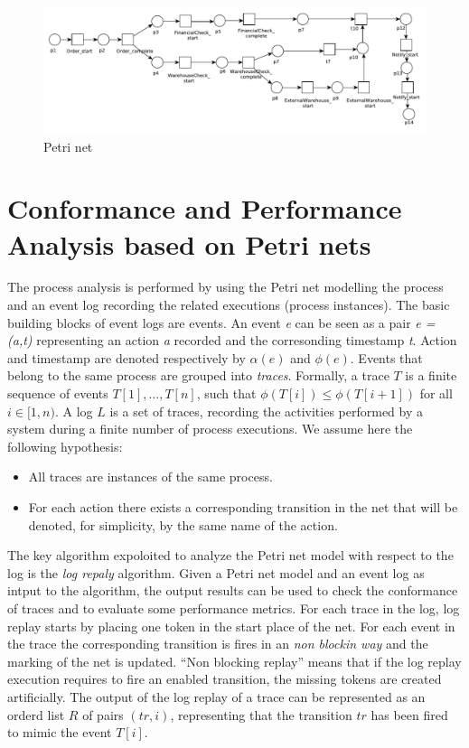 \documentclass[11pt]{article}
\begin{document}
\begin{figure}[h]\label{pnet}
\includegraphics[width=360pt]
{./items/Sales_PN.pdf}
\caption{Petri net}
\end{figure}


\section{Conformance and Performance Analysis based on Petri nets}\label{Background}

The process analysis is performed by using the Petri net modelling the process and an event log recording the related executions (process instances). The basic building blocks of event logs are events. An event {\itshape e} can be seen as a pair {\itshape e = (a,t) } representing an action {\itshape a } recorded and the corresonding timestamp {\itshape t}. Action and timestamp are denoted respectively by $\alpha(e)$ and $\phi(e)$. Events that belong to the same process are grouped into {\itshape traces}. Formally, a trace $T$ is a finite sequence of events $T[1],..., T[n]$, such that $\phi(T[i]) \leq \phi(T[i+1])$ for all  $i \in [1,n)$. A log $L$ is a set of traces, recording the activities performed by a system during a finite number of process executions. We assume here the following hypothesis:
\begin{itemize}
\item All traces are instances of the same process.
\item For each action there exists a corresponding transition in the net that will be denoted, for simplicity, by the same name of the action.
\end{itemize}
The key algorithm expoloited to analyze the Petri net model with respect to the log is the {\itshape log repaly} algorithm. Given a Petri net model and an event log as intput to the algorithm, the output results can be used to check the conformance of traces and to evaluate some performance metrics. For each trace in the log, log replay starts by placing one token in the start place of the net. For each event in the trace the corresponding transition is fires in an {\itshape non blockin way} and the marking of the net is updated. ``Non blocking replay'' means that if the log replay execution requires to fire an enabled transition, the missing tokens are created artificially. The output of the log replay of a trace can be represented as an orderd list $R$ of pairs $(tr, i)$, representing that the transition $tr$ has been fired to mimic the event $T[i]$.
\\
\end{document}
